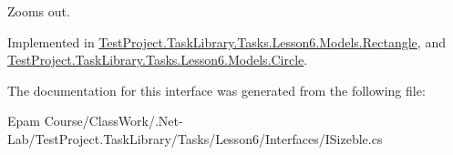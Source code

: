 Zooms out. 



Implemented in \mbox{\hyperlink{class_test_project_1_1_task_library_1_1_tasks_1_1_lesson6_1_1_models_1_1_rectangle_a209c6d610377927da638f31feecfbed0}{Test\+Project.\+Task\+Library.\+Tasks.\+Lesson6.\+Models.\+Rectangle}}, and \mbox{\hyperlink{class_test_project_1_1_task_library_1_1_tasks_1_1_lesson6_1_1_models_1_1_circle_abde3e575c891819e0bd8c97a3d0472e7}{Test\+Project.\+Task\+Library.\+Tasks.\+Lesson6.\+Models.\+Circle}}.



The documentation for this interface was generated from the following file\+:\begin{DoxyCompactItemize}
\item 
Epam Course/\+Class\+Work/.\+Net-\/\+Lab/\+Test\+Project.\+Task\+Library/\+Tasks/\+Lesson6/\+Interfaces/I\+Sizeble.\+cs\end{DoxyCompactItemize}
